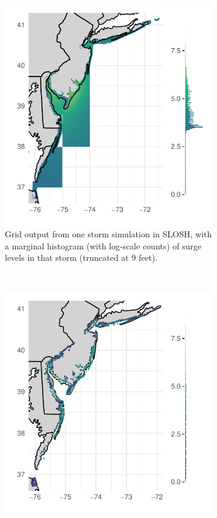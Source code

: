 \begin{figure}[t!]
    \centering
    \begin{subfigure}[t]{0.48\textwidth}
        \centering
        \includegraphics[width=0.99\linewidth]{./plots/slosh1run}
        \caption{Grid output from one storm simulation in SLOSH, with a marginal
            histogram (with log-scale counts) of surge levels in that storm 
            (truncated at 9 feet).\label{fig:slosh1run}}
    \end{subfigure}%
    ~ 
    \begin{subfigure}[t]{0.48\textwidth}
        \centering
        \includegraphics[width=0.99\linewidth]{./plots/sloshthreshold}

\end{subfigure}
\end{figure}
